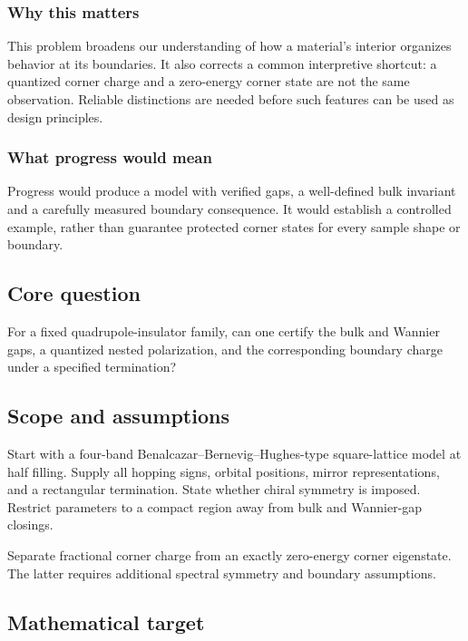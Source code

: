 \documentclass[
  11pt,
]{article}
\begin{document}
\subsubsection{Why this matters}

This problem broadens our understanding of how a material's interior
organizes behavior at its boundaries. It also corrects a common
interpretive shortcut: a quantized corner charge and a zero-energy
corner state are not the same observation. Reliable distinctions are
needed before such features can be used as design principles.

\subsubsection{What progress would mean}

Progress would produce a model with verified gaps, a well-defined bulk
invariant and a carefully measured boundary consequence. It would
establish a controlled example, rather than guarantee protected corner
states for every sample shape or boundary.

\subsection{Core question}

For a fixed quadrupole-insulator family, can one certify the bulk and
Wannier gaps, a quantized nested polarization, and the corresponding
boundary charge under a specified termination?

\subsection{Scope and assumptions}

Start with a four-band Benalcazar--Bernevig--Hughes-type square-lattice
model at half filling. Supply all hopping signs, orbital positions,
mirror representations, and a rectangular termination. State whether
chiral symmetry is imposed. Restrict parameters to a compact region away
from bulk and Wannier-gap closings.

Separate fractional corner charge from an exactly zero-energy corner
eigenstate. The latter requires additional spectral symmetry and
boundary assumptions.

\subsection{Mathematical target}
\end{document}
